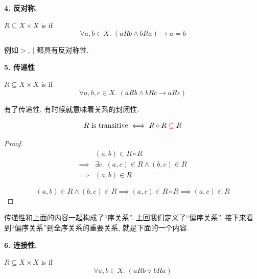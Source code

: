\textbf{4. 反对称. }

\begin{definition}
  $R \subseteq X \times X$ is  if
  \[
    \forall a, b \in X.\; (a R b \land b R a) \to a = b
  \]
\end{definition}

例如$>$, $|$ 都具有反对称性. 

\textbf{5. 传递性}

\begin{definition}
  $R \subseteq X \times X$ is  if
  \[
    \forall a, b, c \in X.\; (a R b \land b R c \to a R c)
  \]

  \begin{center}
\end{center}
\end{definition}

有了传递性, 有时候就意味着关系的封闭性. 
\begin{theorem}
  \[
    R \text{ is transitive} \iff R \circ R \;\textcolor{red}{\subseteq}\; R
  \]
\end{theorem}
\begin{proof}
  \setcounter{equation}{0}
  \begin{align*}
    &(a, b) \in R \circ R \\
    \implies& \exists c.\; (a, c) \in R \land (b, c) \in R \\
    \implies& (a, b) \in R
  \end{align*}

  \vspace{0.30cm}
  
    \[
      (a, b) \in R \land (b, c) \in R
      \implies (a, c) \in R \circ R
      \implies (a, c) \in R
    \]
  
\end{proof}

传递性和上面的内容一起构成了``序关系''. 上回我们定义了``偏序关系''. 接下来看到``偏序关系''到全序关系的重要关系, 就是下面的一个内容. 


\textbf{6. 连接性.}

\begin{definition}
  $R \subseteq X \times X$ is  if
  \[
    \forall a, b \in X.\; (a R b \lor b R a)
  \]
\end{definition}

